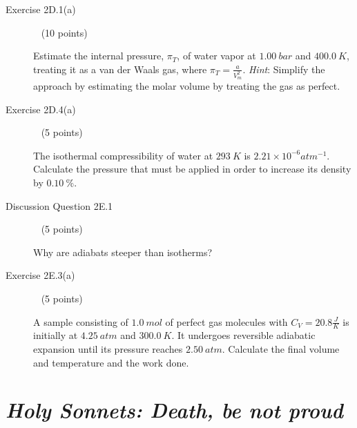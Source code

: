 \documentclass[12pt, openany, letterpaper]{memoir}
\begin{document}
\begin{description}
	      \vspace{20em}
	\item [Exercise 2D.1(a)] ~ (10 points)

	      Estimate the internal pressure, $\pi_T$, of water vapor at $1.00~bar$ and $400.0~K$, treating it as a van der Waals gas, where $\pi_T=\frac{a}{V_m^2}$. \emph{Hint}: Simplify the approach by estimating the molar volume by treating the gas as perfect.

	      \vspace{20em}
	\item [Exercise 2D.4(a)] ~ (5 points)

	      The isothermal compressibility of water at $293~K$ is $2.21\times10^{-6}atm^{-1}$. Calculate the pressure that must be applied in order to increase its density by $0.10~\%$.

	      \vspace{12em}
	\item [Discussion Question 2E.1] ~ (5 points)

	      Why are adiabats steeper than isotherms?

	      \vspace{10em}
	\item [Exercise 2E.3(a)] ~ (5 points)

	      A sample consisting of $1.0~mol$ of perfect gas molecules with $C_V=20.8\frac{J}{K}$ is initially at $4.25~atm$ and $300.0~K$. It undergoes reversible adiabatic expansion until its pressure reaches $2.50~atm$. Calculate the final volume and temperature and the work done.
\end{description}

\newpage
\pagestyle{empty}
\addtocounter{page}{-1}
\section*{\emph{Holy Sonnets: Death, be not proud}}
\end{document}
